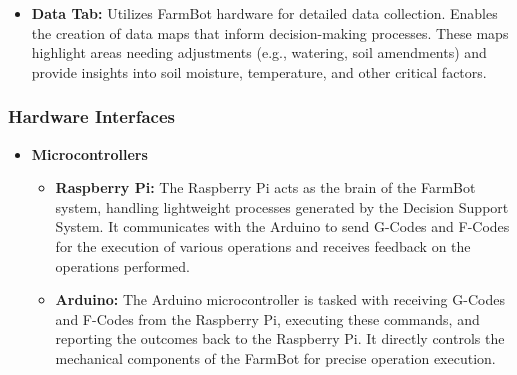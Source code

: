 \begin{itemize}
    \item \textbf{Data Tab:} Utilizes FarmBot hardware for detailed data collection. Enables the creation of data maps that inform decision-making processes. These maps highlight areas needing adjustments (e.g., watering, soil amendments) and provide insights into soil moisture, temperature, and other critical factors.
    
\end{itemize}

\subsubsection{Hardware Interfaces}
\begin{itemize}
    \item \textbf{Microcontrollers}
    \begin{itemize}
        \item \textbf{Raspberry Pi:} The Raspberry Pi acts as the brain of the FarmBot system, handling lightweight processes generated by the Decision Support System. It communicates with the Arduino to send G-Codes and F-Codes for the execution of various operations and receives feedback on the operations performed.
        \item \textbf{Arduino:} The Arduino microcontroller is tasked with receiving G-Codes and F-Codes from the Raspberry Pi, executing these commands, and reporting the outcomes back to the Raspberry Pi. It directly controls the mechanical components of the FarmBot for precise operation execution.
    \end{itemize}


\end{itemize}
